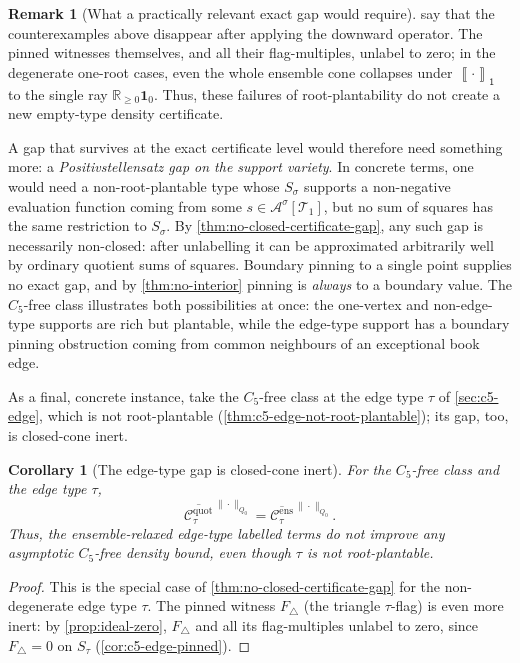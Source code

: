 \documentclass[11pt]{article}
\newtheorem{corollary}[corollary]{Corollary}
\theoremstyle{definition}
\newtheorem{remark}[remark]{Remark}
\newcommand{\R}{\mathbb{R}}
\newcommand{\A}{\mathcal{A}}
\newcommand{\T}{\mathcal{T}}
\newcommand{\C}{\mathcal{C}}
\newcommand{\avg}[2]{\left\llbracket #1 \right\rrbracket_{#2}}
\newcommand{\one}{\mathbf 1}
\newcommand{\vtype}{\mathsf{1}}
\begin{document}
\begin{remark}[What a practically relevant exact gap would require]
 say that the counterexamples above disappear
after applying the downward operator.  The pinned witnesses themselves, and all their
flag-multiples, unlabel to zero; in the degenerate one-root cases, even the whole
ensemble cone collapses under $\avg{\cdot}{\vtype}$ to the single ray
$\R_{\ge0}\one_0$.  Thus, these failures of root-plantability do not create a new
empty-type density certificate.

A gap that survives at the exact certificate level would therefore need something more:
a \emph{Positivstellensatz gap on the support variety}.  In concrete terms, one would need
a non-root-plantable type whose $S_\sigma$ supports a non-negative evaluation function
coming from some $s\in\A^\sigma[\T_1]$, but no sum of squares has the same restriction to
$S_\sigma$.  By \cref{thm:no-closed-certificate-gap}, any such gap is necessarily
non-closed: after unlabelling it can be approximated arbitrarily well by ordinary
quotient sums of squares.  Boundary pinning to a single point supplies no exact gap, and
by \cref{thm:no-interior} pinning is \emph{always} to a boundary value.  The $C_5$-free
class illustrates both possibilities at once: the one-vertex and non-edge-type supports
are rich but plantable, while the edge-type support has a boundary pinning obstruction
coming from common neighbours of an exceptional book edge.
\end{remark}

As a final, concrete instance, take the $C_5$-free class at the edge type $\tau$ of
\cref{sec:c5-edge}, which is not root-plantable (\cref{thm:c5-edge-not-root-plantable});
its gap, too, is closed-cone inert.

\begin{corollary}[The edge-type gap is closed-cone inert]\label{cor:c5-edge-closed-inert}
For the $C_5$-free class and the edge type $\tau$,
\[
  \overline{\C^{\mathrm{quot}}_\tau}^{\,\|\cdot\|_{Q_0}}
  =
  \overline{\C^{\mathrm{ens}}_\tau}^{\,\|\cdot\|_{Q_0}} .
\]
Thus, the ensemble-relaxed edge-type labelled terms do not improve any asymptotic
$C_5$-free density bound, even though $\tau$ is not root-plantable.
\end{corollary}

\begin{proof}
This is the special case of \cref{thm:no-closed-certificate-gap} for the
non-degenerate edge type $\tau$.  The pinned witness $F_\triangle$ (the triangle $\tau$-flag) is even
more inert: by \cref{prop:ideal-zero}, $F_\triangle$ and all its flag-multiples unlabel to zero, since
$F_\triangle=0$ on $S_\tau$ (\cref{cor:c5-edge-pinned}).
\end{proof}
\end{document}
